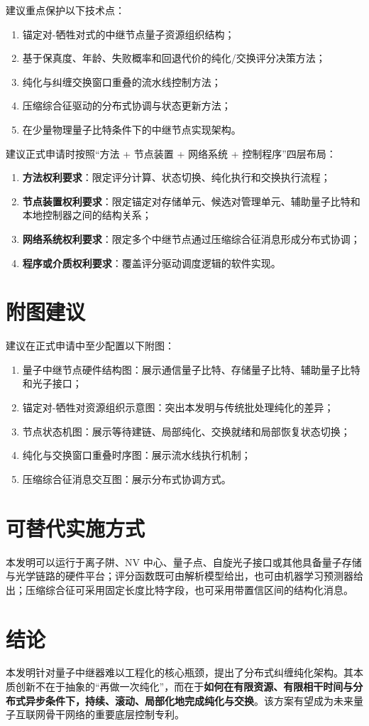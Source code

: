 \documentclass[12pt,a4paper]{article}
\begin{document}
建议重点保护以下技术点：
\begin{enumerate}[label=(\arabic*)]
    \item 锚定对-牺牲对式的中继节点量子资源组织结构；
    \item 基于保真度、年龄、失败概率和回退代价的纯化/交换评分决策方法；
    \item 纯化与纠缠交换窗口重叠的流水线控制方法；
    \item 压缩综合征驱动的分布式协调与状态更新方法；
    \item 在少量物理量子比特条件下的中继节点实现架构。
\end{enumerate}

建议正式申请时按照“方法 + 节点装置 + 网络系统 + 控制程序”四层布局：
\begin{enumerate}[label=(\arabic*)]
    \item \textbf{方法权利要求}：限定评分计算、状态切换、纯化执行和交换执行流程；
    \item \textbf{节点装置权利要求}：限定锚定对存储单元、候选对管理单元、辅助量子比特和本地控制器之间的结构关系；
    \item \textbf{网络系统权利要求}：限定多个中继节点通过压缩综合征消息形成分布式协调；
    \item \textbf{程序或介质权利要求}：覆盖评分驱动调度逻辑的软件实现。
\end{enumerate}

\section{附图建议}

建议在正式申请中至少配置以下附图：
\begin{enumerate}[label=(\arabic*)]
    \item 量子中继节点硬件结构图：展示通信量子比特、存储量子比特、辅助量子比特和光子接口；
    \item 锚定对-牺牲对资源组织示意图：突出本发明与传统批处理纯化的差异；
    \item 节点状态机图：展示等待建链、局部纯化、交换就绪和局部恢复状态切换；
    \item 纯化与交换窗口重叠时序图：展示流水线执行机制；
    \item 压缩综合征消息交互图：展示分布式协调方式。
\end{enumerate}

\section{可替代实施方式}

本发明可以运行于离子阱、NV 中心、量子点、自旋光子接口或其他具备量子存储与光学链路的硬件平台；评分函数既可由解析模型给出，也可由机器学习预测器给出；压缩综合征可采用固定长度比特字段，也可采用带置信区间的结构化消息。

\section{结论}

本发明针对量子中继器难以工程化的核心瓶颈，提出了分布式纠缠纯化架构。其本质创新不在于抽象的“再做一次纯化”，而在于\textbf{如何在有限资源、有限相干时间与分布式异步条件下，持续、滚动、局部化地完成纯化与交换}。该方案有望成为未来量子互联网骨干网络的重要底层控制专利。
\end{document}
